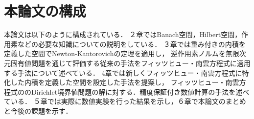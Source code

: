 \section{本論文の構成}
本論文は以下のように構成されている．
２章ではBanach空間，Hilbert空間，作用素などの必要な知識についての説明をしている．
３章では重み付きの内積を定義した空間でNewton-Kantorovichの定理\cite{bookoisi}を適用し，
逆作用素ノルムを無限次元固有値問題を通じて評価する従来の手法をフィッツヒュー・南雲方程式に適用する手法について述べている．
4章では新しくフィッツヒュー・南雲方程式に特化した内積を定義した空間を設定した手法を提案し，
フィッツヒュー・南雲方程式ののDirichlet境界値問題の解に対する．精度保証付き数値計算の手法を述べている．
５章では実際に数値実験を行った結果を示し，６章で本論文のまとめと今後の課題を示す．

